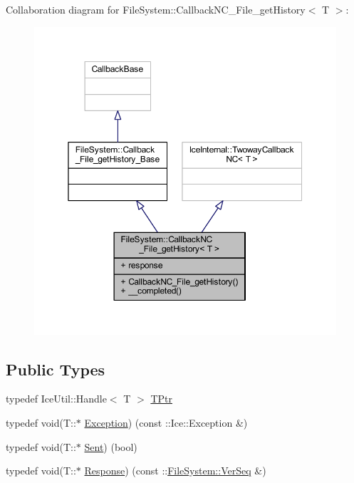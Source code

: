 Collaboration diagram for File\+System\+:\+:Callback\+N\+C\+\_\+\+File\+\_\+get\+History$<$ T $>$\+:
\nopagebreak
\begin{figure}[H]
\begin{center}
\leavevmode
\includegraphics[width=350pt]{class_file_system_1_1_callback_n_c___file__get_history__coll__graph}
\end{center}
\end{figure}
\subsection*{Public Types}
\begin{DoxyCompactItemize}
\item 
typedef Ice\+Util\+::\+Handle$<$ T $>$ \hyperlink{class_file_system_1_1_callback_n_c___file__get_history_ae005e81d63a5bdcf9b9aafc40a28ff6b}{T\+Ptr}
\item 
typedef void(T\+::$\ast$ \hyperlink{class_file_system_1_1_callback_n_c___file__get_history_a828dbde2a7dd89e32a5e98ea6a92c9a7}{Exception}) (const \+::Ice\+::\+Exception \&)
\item 
typedef void(T\+::$\ast$ \hyperlink{class_file_system_1_1_callback_n_c___file__get_history_a9e909ff9b45d83e890c037566c529f6e}{Sent}) (bool)
\item 
typedef void(T\+::$\ast$ \hyperlink{class_file_system_1_1_callback_n_c___file__get_history_a7fef6c01133235ae7b604366d356eae4}{Response}) (const \+::\hyperlink{namespace_file_system_ac32dc1eb34c060160b52edc7c4e37d6e}{File\+System\+::\+Ver\+Seq} \&)
\end{DoxyCompactItemize}

